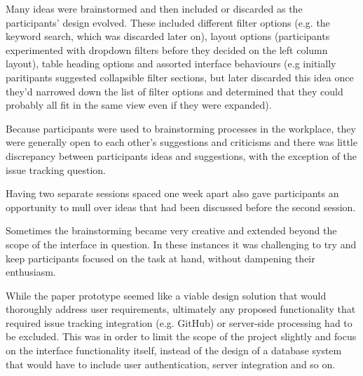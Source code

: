 Many ideas were brainstormed and then included or discarded as the participants' design evolved. These included different filter options (e.g. the keyword search, which was discarded later on), layout options (participants experimented with dropdown filters before they decided on the left column layout), table heading options and assorted interface behaviours (e.g initially paritipants suggested collapsible filter sections, but later discarded this idea once they'd narrowed down the list of filter options and determined that they could probably all fit in the same view even if they were expanded).  

Because participants were used to brainstorming processes in the workplace, they were generally open to each other's suggestions and criticisms and there was little discrepancy between participants ideas and suggestions, with the exception of the issue tracking question. 

Having two separate sessions spaced one week apart also gave participants an opportunity to mull over ideas that had been discussed before the second session. 

Sometimes the brainstorming became very creative and extended beyond the scope of the interface in question. In these instances it  was challenging to try and keep participants focused on the task at hand, without dampening their enthusiasm. 

While the paper prototype seemed like a viable design solution that would thoroughly address user requirements, ultimately any proposed functionality that required issue tracking integration (e.g. GitHub) or server-side processing had to be excluded. This was in order to limit the scope of the project slightly and focus on the interface functionality itself, instead of the design of a database system that would have to include user authentication, server integration and so on. 
